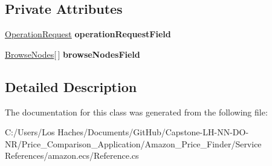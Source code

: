 \subsection*{Private Attributes}
\begin{DoxyCompactItemize}
\item 
\hypertarget{class_price___comparison_1_1amazon_1_1ecs_1_1_browse_node_lookup_response_a38644779fef464d61cea23e4f7a7eb25}{\hyperlink{class_price___comparison_1_1amazon_1_1ecs_1_1_operation_request}{Operation\-Request} {\bfseries operation\-Request\-Field}}\label{class_price___comparison_1_1amazon_1_1ecs_1_1_browse_node_lookup_response_a38644779fef464d61cea23e4f7a7eb25}

\item 
\hypertarget{class_price___comparison_1_1amazon_1_1ecs_1_1_browse_node_lookup_response_a124c39d11cdc1cab5662f81f73321f4d}{\hyperlink{class_price___comparison_1_1amazon_1_1ecs_1_1_browse_nodes}{Browse\-Nodes}\mbox{[}$\,$\mbox{]} {\bfseries browse\-Nodes\-Field}}\label{class_price___comparison_1_1amazon_1_1ecs_1_1_browse_node_lookup_response_a124c39d11cdc1cab5662f81f73321f4d}

\end{DoxyCompactItemize}


\subsection{Detailed Description}


The documentation for this class was generated from the following file\-:\begin{DoxyCompactItemize}
\item 
C\-:/\-Users/\-Los Haches/\-Documents/\-Git\-Hub/\-Capstone-\/\-L\-H-\/\-N\-N-\/\-D\-O-\/\-N\-R/\-Price\-\_\-\-Comparison\-\_\-\-Application/\-Amazon\-\_\-\-Price\-\_\-\-Finder/\-Service References/amazon.\-ecs/Reference.\-cs\end{DoxyCompactItemize}
